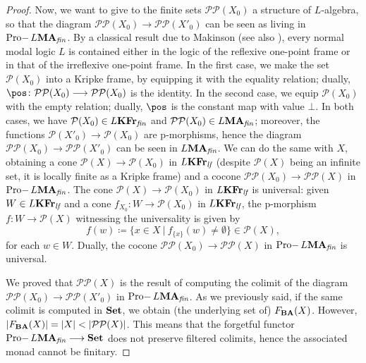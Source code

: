 \documentclass{article}
\theoremstyle{definition}
\DeclareMathOperator{\Pro}{Pro-}
\newcommand{\KFr}{\textup{\textbf{KFr}}}
\newcommand{\MA}{\textup{\textbf{MA}}}
\newcommand{\BA}{\textup{\textbf{BA}}}
\newcommand{\fin}{\textit{fin}}
\newcommand{\lf}{\textit{lf}}
\newcommand{\Set}{\textup{\textbf{Set}}}
\begin{document}
\begin{proof}
Now, we want to give to the finite sets $\mathcal{P} \mathcal{P}(X_0)$ a structure of $L$-algebra, so that the diagram $\mathcal{P} \mathcal{P} (X_0) \longrightarrow \mathcal{P} \mathcal{P} (X'_0)$ can be seen as living in $\Pro L\MA_\fin$. By a classical result due to Makinson (see also \cite[Prop. 3.17]{Modal}), every normal modal logic $L$ is contained either in the logic of the reflexive one-point frame or in that of the irreflexive one-point frame. In the first case, we make the set $\mathcal{P}(X_0)$ into a Kripke frame, by equipping it with the equality relation; dually, $\pos \colon \mathcal{P} \mathcal{P}(X_0) \longrightarrow \mathcal{P} \mathcal{P}(X_0)$ is the identity. In the second case, we equip $\mathcal{P}(X_0)$ with the empty relation; dually, $\pos$ is the constant map with value $\bot$. In both cases, we have $\mathcal{P}(X_0) \in L\KFr_\fin$ and $\mathcal{P} \mathcal{P}(X_0) \in L\MA_\fin$; moreover, the functions $\mathcal{P}(X'_0) \longrightarrow \mathcal{P}(X_0)$ are p-morphisms, hence the diagram $\mathcal{P} \mathcal{P} (X_0) \longrightarrow \mathcal{P} \mathcal{P} (X'_0)$ can be seen in $L\MA_\fin$. We can do the same with $X$, obtaining a cone $\mathcal{P}(X) \longrightarrow \mathcal{P}(X_0)$ in $L\KFr_\lf$ (despite $\mathcal{P}(X)$ being an infinite set, it is locally finite as a Kripke frame) and a cocone $\mathcal{P} \mathcal{P} (X_0) \longrightarrow \mathcal{P} \mathcal{P}(X)$ in $\Pro L\MA_\fin$. The cone $\mathcal{P}(X) \longrightarrow \mathcal{P}(X_0)$ in $L\KFr_\lf$ is universal: given $W \in L\KFr_\lf$ and a cone $f_{X_0} \colon W \longrightarrow \mathcal{P}(X_0)$ in $L\KFr_\lf$, the p-morphism $f \colon W \longrightarrow \mathcal{P}(X)$ witnessing the universality is given by
$$f(w) \coloneqq \{x \in X\ \vert\ f_{\{x\}}(w) \neq \emptyset\} \in \mathcal{P}(X),$$
for each $w \in W$. Dually, the cocone $\mathcal{P} \mathcal{P} (X_0) \longrightarrow \mathcal{P} \mathcal{P}(X)$ in $\Pro L\MA_\fin$ is universal.

We proved that $\mathcal{P} \mathcal{P}(X)$ is the result of computing the colimit of the diagram $\mathcal{P} \mathcal{P} (X_0) \longrightarrow \mathcal{P} \mathcal{P} (X'_0)$ in $\Pro L\MA_\fin$. As we previously said, if the same colimit is computed in $\Set$, we obtain (the underlying set of) $F_{\BA}(X)$. However, $|F_{\BA}(X)| = |X| < |\mathcal{P} \mathcal{P} (X)|$. This means that the forgetful functor $\Pro L\MA_\fin \longrightarrow \Set$ does not preserve filtered colimits, hence the associated monad cannot be finitary.
\end{proof}
\end{document}
